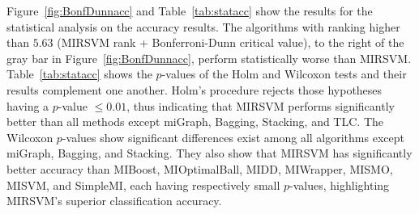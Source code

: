 \documentclass[reqno]{vcuthesis}
\numberwithin{equation}{chapter}
\begin{document}
Figure~\ref{fig:BonfDunnacc} and Table~\ref{tab:statacc} show the results for the statistical analysis on the accuracy results. The algorithms with ranking higher than $5.63$ (MIRSVM rank + Bonferroni-Dunn critical value), to the right of the gray bar in Figure~\ref{fig:BonfDunnacc}, perform statistically worse than MIRSVM. Table~\ref{tab:statacc} shows the $p$-values of the Holm and Wilcoxon tests and their results complement one another. Holm's procedure rejects those hypotheses having a $p$-value $\leq 0.01$, thus indicating that MIRSVM performs significantly better than all methods except miGraph, Bagging, Stacking, and TLC. The Wilcoxon $p$-values show significant differences exist among all algorithms except miGraph, Bagging, and Stacking. They also show that MIRSVM has significantly better accuracy than MIBoost, MIOptimalBall, MIDD, MIWrapper, MISMO, MISVM, and SimpleMI, each having respectively small $p$-values, highlighting MIRSVM's superior classification accuracy. 
\end{document}
